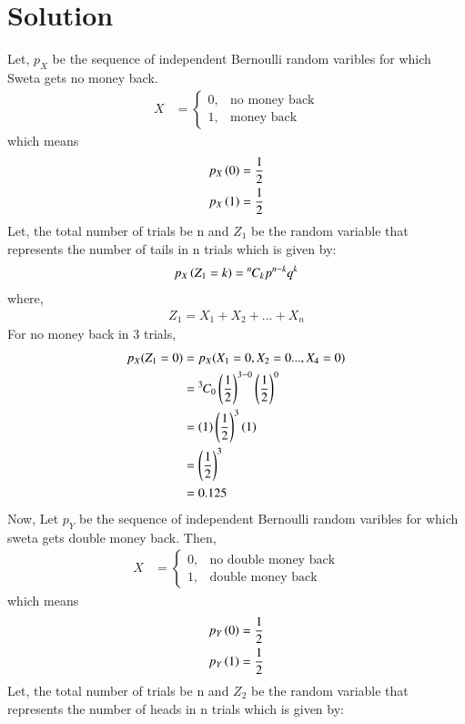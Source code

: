 \documentclass[journal,12pt,twocolumn]{IEEEtran}
\theoremstyle{remark}
\begin{document}
\section{Solution}Let, $p_X$ be the sequence of independent Bernoulli random varibles for which Sweta gets no money back. 
\begin{align}
	X &= 
  		\begin{cases}
  			0, & \text{no money back}\\
  			1, & \text{money back} 
  		\end{cases}
\end{align}
which means
\begin{align}
	p_X\left(0\right) = \frac{1}{2} \\
	p_X\left(1\right) = \frac{1}{2} \\
\end{align} 
Let, the total number of trials be n and $Z_1$ be the random variable that represents the number of tails in n trials which is given by:
\begin{align}
\label{eq:pr-pts/5} p_X\left(Z_1=k\right) = {{}^{n}\mkern-1muC_{k}}p^{n-k}q^{k}
\end{align}
where,
\begin{align}
	Z_1 = X_1 + X_2 + ... + X_n 
\end{align}
For no money back in 3 trials,
\begin{align}
	p_X(Z_1 = 0) &= p_X(X_1=0,X_2=0 ... ,X_4=0) \\
 		&= {{}^{3}\mkern-1muC_{0}}\left(\frac{1}{2}\right)^{3-0}\left(\frac{1}{2}\right)^{0} \\
 		&= \left(1\right)\left(\frac{1}{2}\right)^{3}\left(1\right) \\
 		&= \left(\frac{1}{2}\right)^{3} \\
		\label{eq:pr-pts/11} &= 0.125 
\end{align}
Now, Let $p_Y$ be the sequence of independent Bernoulli random varibles for which sweta gets double money back.
Then,
\begin{align}
	X &= 
  		\begin{cases}
  			0, & \text{no double money back}\\
  			1, & \text{double money back} 
  		\end{cases}
\end{align}
which means
\begin{align}
	p_Y\left(0\right) = \frac{1}{2} \\
	p_Y\left(1\right) = \frac{1}{2} \\
\end{align}
Let, the total number of trials be n and $Z_2$ be the random variable that represents the number of heads in n trials which is given by: 
\end{document}
